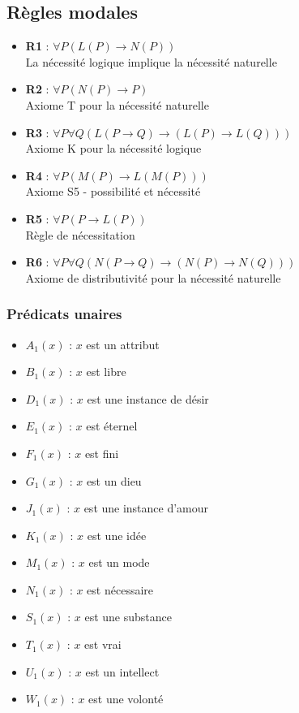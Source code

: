 \documentclass[11pt,a4paper]{article}
\begin{document}
\subsection{Règles modales}
\begin{itemize}
    \item \textbf{R1} : $\forall P (L(P) \rightarrow N(P))$ \\
    La nécessité logique implique la nécessité naturelle
    
    \item \textbf{R2} : $\forall P (N(P) \rightarrow P)$ \\
    Axiome T pour la nécessité naturelle
    
    \item \textbf{R3} : $\forall P \forall Q (L(P \rightarrow Q) \rightarrow (L(P) \rightarrow L(Q)))$ \\
    Axiome K pour la nécessité logique
    
    \item \textbf{R4} : $\forall P (M(P) \rightarrow L(M(P)))$ \\
    Axiome S5 - possibilité et nécessité
    
    \item \textbf{R5} : $\forall P (P \rightarrow L(P))$ \\
    Règle de nécessitation
    
    \item \textbf{R6} : $\forall P \forall Q (N(P \rightarrow Q) \rightarrow (N(P) \rightarrow N(Q)))$ \\
    Axiome de distributivité pour la nécessité naturelle
\end{itemize}

\subsubsection{Prédicats unaires}
\begin{itemize}
    \item $A_1(x)$ : $x$ est un attribut
    \item $B_1(x)$ : $x$ est libre
    \item $D_1(x)$ : $x$ est une instance de désir
    \item $E_1(x)$ : $x$ est éternel
    \item $F_1(x)$ : $x$ est fini
    \item $G_1(x)$ : $x$ est un dieu
    \item $J_1(x)$ : $x$ est une instance d'amour
    \item $K_1(x)$ : $x$ est une idée
    \item $M_1(x)$ : $x$ est un mode
    \item $N_1(x)$ : $x$ est nécessaire
    \item $S_1(x)$ : $x$ est une substance
    \item $T_1(x)$ : $x$ est vrai
    \item $U_1(x)$ : $x$ est un intellect
    \item $W_1(x)$ : $x$ est une volonté
\end{itemize}
\end{document}
